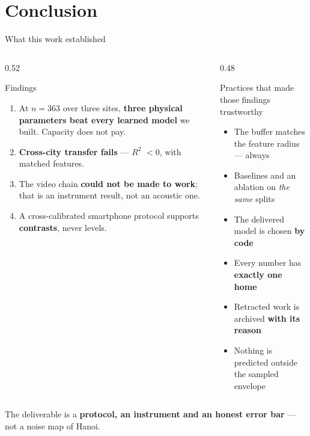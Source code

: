 \documentclass[aspectratio=169,10pt]{beamer}
\newcommand{\rr}{$R^2$}
\begin{document}
\section{Conclusion}

\begin{frame}{What this work established}
  \begin{columns}[T]
    \begin{column}{0.52\textwidth}
      \begin{exampleblock}{Findings}
        \begin{enumerate}
          \item At $n=363$ over three sites, \textbf{three physical parameters beat
                every learned model} we built. Capacity does not pay.
          \item \textbf{Cross-city transfer fails} --- \rr{} $<0$, with matched
                features.
          \item The video chain \textbf{could not be made to work}; that is an
                instrument result, not an acoustic one.
          \item A cross-calibrated smartphone protocol supports \textbf{contrasts},
                never levels.
        \end{enumerate}
      \end{exampleblock}
    \end{column}
    \begin{column}{0.48\textwidth}
      \begin{block}{Practices that made those findings trustworthy}
        \begin{itemize}
          \item The buffer matches the feature radius --- always
          \item Baselines and an ablation on \emph{the same} splits
          \item The delivered model is chosen \textbf{by code}
          \item Every number has \textbf{exactly one home}
          \item Retracted work is archived \textbf{with its reason}
          \item Nothing is predicted outside the sampled envelope
        \end{itemize}
      \end{block}
    \end{column}
  \end{columns}
  \vfill
  \begin{center}
    \small The deliverable is a \textbf{protocol, an instrument and an honest
    error bar} --- not a noise map of Hanoi.
  \end{center}
\end{frame}
\end{document}
